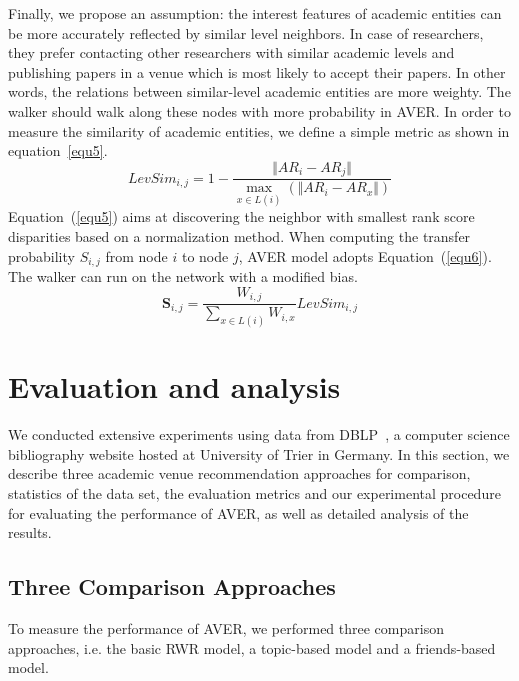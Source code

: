 \documentclass[9pt]{acm_proc_article-sp}
\begin{document}
Finally, we propose an assumption: the interest features of academic entities can be more accurately reflected by similar level neighbors. In case of researchers, they prefer contacting other researchers with similar academic levels and publishing papers in a venue which is most likely to accept their papers. In other words, the relations between similar-level academic entities are more weighty. The walker should walk along these nodes with more probability in AVER. In order to measure the similarity of academic entities, we define a simple metric as shown in equation~\ref{equ5}.
\begin{equation}
\label{equ5}
LevSim_{i,j}=1-\frac{\Vert AR_{i}-AR_{j}\Vert}{\max_{x\in L(i)}(\Vert AR_{i}-AR_{x}\Vert)}
\end{equation}
 Equation~(\ref{equ5}) aims at discovering the neighbor with smallest rank score disparities based on a normalization method. When computing the transfer probability $S_{i,j}$ from node $i$ to node $j$, AVER model adopts Equation~(\ref{equ6}). The walker can run on the network with a modified bias.
\begin{equation}
\label{equ6}
\mathbf{S}_{i,j}=\frac{W_{i,j}}{\sum_{x\in L(i)}W_{i,x}}LevSim_{i,j}
\end{equation}

\section{Evaluation and analysis}
\label{section:evaluation}
We conducted extensive experiments using data from DBLP~\cite{Ley:DBLP}, a computer science bibliography website hosted at University of Trier in Germany. In this section, we describe three academic venue recommendation approaches for comparison, statistics of the data set, the evaluation metrics and our experimental procedure for evaluating the performance of AVER, as well as detailed analysis of the results.

\subsection{Three Comparison Approaches}
To measure the performance of AVER, we performed three comparison approaches, i.e. the basic RWR model, a topic-based model and a friends-based model.
\end{document}
